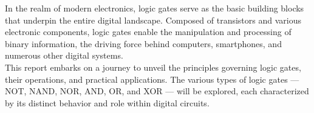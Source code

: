 \abstract
In the realm of modern electronics, logic gates serve as the basic building blocks that underpin the entire digital landscape. 
Composed of transistors and various electronic components, logic gates enable the manipulation and processing of binary information, the driving force behind computers, smartphones, and numerous other digital systems. \\
This report embarks on a journey to unveil the principles governing logic gates, their operations, and practical applications. 
The various types of logic gates — NOT, NAND, NOR, AND, OR, and XOR — will be explored, each characterized by its distinct behavior and role within digital circuits.